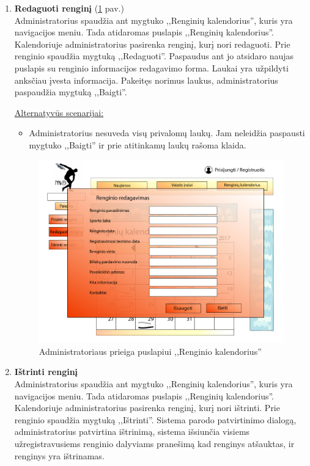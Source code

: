 \documentclass{VUMIFPSkursinis}
\begin{document}
\begin{enumerate} [label = \textbf{U\arabic*.}]
			\item \textbf{Redaguoti renginį} (\ref{fig:uzd_admin_renginioKalendorius} pav.)\\
					Administratorius spaudžia ant mygtuko ,,Renginių kalendorius'', kuris yra navigacijos meniu. Tada atidaromas puslapis ,,Renginių kalendorius''. Kalendoriuje administratorius pasirenka renginį, kurį nori redaguoti. Prie renginio spaudžia mygtuką ,,Redaguoti''. Paspaudus ant jo atsidaro naujas puslapis su renginio informacijos redagavimo forma. Laukai yra užpildyti anksčiau įvesta informacija. Pakeitęs norimus laukus, administratorius paspaudžia mygtuką ,,Baigti''.
					
					\underline{Alternatyvūs scenarijai:}
					\begin{itemize}
						\item Administratorius nesuveda visų privalomų laukų. Jam neleidžia paspausti mygtuko ,,Baigti'' ir prie atitinkamų laukų rašoma klaida.
					\end{itemize}
				
				\begin{figure}[H]
					\centering
					\includegraphics[width=\textwidth]{img/PSI4/AdminRenginioKalendorius-01.jpg}
					\caption{Administratoriaus prieiga puslapiui ,,Renginio kalendorius''}
					\label{fig:uzd_admin_renginioKalendorius}
				\end{figure}
				
			\item \textbf{Ištrinti renginį}   \\
					Administratorius spaudžia ant mygtuko ,,Renginių kalendorius'', kuris yra navigacijos meniu. Tada atidaromas puslapis ,,Renginių kalendorius''. Kalendoriuje administratorius pasirenka renginį, kurį nori ištrinti. Prie renginio spaudžia mygtuką ,,Ištrinti''. Sistema parodo patvirtinimo dialogą, administratorius patvirtina ištrinimą, sistema išsiunčia visiems užregistravusiems renginio dalyviams pranešimą kad renginys atšauktas, ir renginys yra ištrinamas.
					

\end{enumerate}
\end{document}
